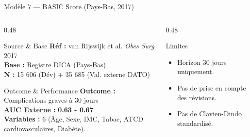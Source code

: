 \documentclass[aspectratio=169]{beamer}
\newcommand{\tightlist}{%
  \setlength{\itemsep}{1pt}\setlength{\parskip}{0pt}%
  \setlength{\parsep}{0pt}\setlength{\topsep}{2pt}}
\begin{document}
\begin{frame}[shrink=5]{Modèle 7 --- BASIC Score (Pays-Bas, 2017)}
  \begin{columns}[T]
    \begin{column}{0.48\textwidth}
      \begin{block}{Source \& Base}
        \footnotesize
        \textbf{Réf :} van Rijswijk et al. \textit{Obes Surg} 2017\\
        \textbf{Base :} Registre DICA (Pays-Bas)\\
        \textbf{N :} 15 606 (Dév) + 35 685 (Val. externe DATO)
      \end{block}
      \begin{block}{Outcome \& Performance}
        \footnotesize
        \textbf{Outcome :} Complications graves à 30 jours\\
        \textbf{AUC Externe :} \textcolor{orangemod}{\textbf{0.63 - 0.67}}\\
        \textbf{Variables :} 6 (Âge, Sexe, IMC, Tabac, ATCD cardiovasculaires, Diabète).
      \end{block}
    \end{column}
    \begin{column}{0.48\textwidth}
      \begin{alertblock}{Limites}
        \footnotesize\tightlist
        \begin{itemize}\tightlist
          \item Horizon 30 jours uniquement.
          \item Pas de prise en compte des révisions.
          \item Pas de Clavien-Dindo standardisé.
        \end{itemize}
      \end{alertblock}
    \end{column}
  \end{columns}
\end{frame}
\end{document}
